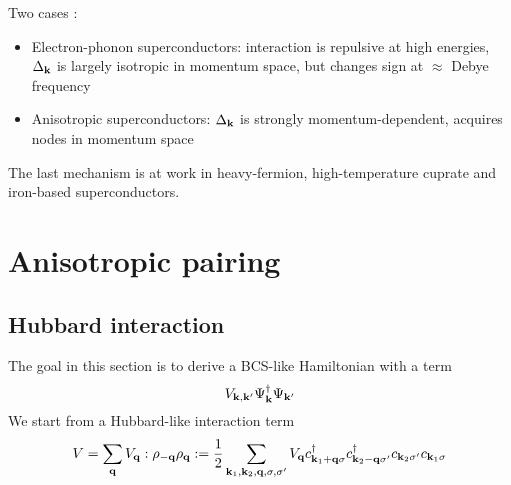 Two cases :
\begin{itemize}
    \item Electron-phonon superconductors: interaction is repulsive at high energies, \(\Delta_{\mathbf{k}}\) is largely isotropic in momentum space, but changes sign at \(\approx\) Debye frequency
    \item Anisotropic superconductors: \(\Delta_{\mathbf{k}}\) is strongly momentum-dependent, acquires nodes in momentum space
\end{itemize}
The last mechanism is at work in heavy-fermion, high-temperature cuprate  and iron-based superconductors.

\section{Anisotropic pairing}

\subsection{Hubbard interaction}

The goal in this section is to derive a BCS-like Hamiltonian with a term
\begin{equation}
    V_{\mathbf{k}, \mathbf{k}^{\prime}} \Psi^{\dagger}_{\mathbf{k}} \Psi_{\mathbf{k}^{\prime}}
\end{equation}
We start from a Hubbard-like interaction term
\begin{equation}
    V = \sum_{\mathbf{q}} V_{\mathbf{q}} : \rho_{-\mathbf{q}} \rho_{\mathbf{q}} : = \frac{1}{2} \sum_{\mathbf{k}_1, \mathbf{k}_2, \mathbf{q}, \sigma, \sigma^{\prime}} V_{\mathbf{q}} c_{\mathbf{k}_1 + \mathbf{q} \sigma}^{\dagger} c_{\mathbf{k}_2 - \mathbf{q} \sigma^{\prime}}^{\dagger} c_{\mathbf{k}_2 \sigma^{\prime}} c_{\mathbf{k}_1 \sigma}
\end{equation}


